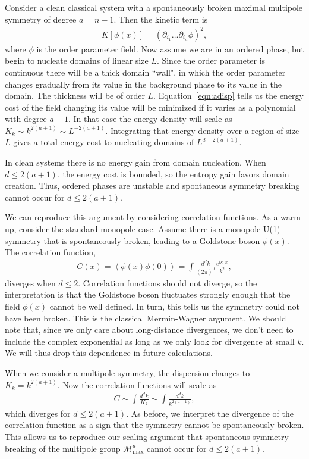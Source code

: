 \documentclass[twocolumn, longbibliography]{revtex4-2}
\renewcommand{\max}{\text{max}}
\begin{document}
Consider a clean classical system with a spontaneously broken maximal multipole symmetry of degree $a=n-1$.
Then the kinetic term is
\begin{align}
K[\phi(x)] = (\partial_{i_1} \dots \partial_{i_n} \phi)^2, \label{eqn:adisp}
\end{align} 
where $\phi$ is the order parameter field. 
Now assume we are in an ordered phase, but begin to nucleate domains of linear size $L$. Since the order parameter is continuous there will be a thick domain ``wall", in which the order parameter changes gradually from its value in the background phase to its value in the domain. The thickness will be of order $L$.
Equation~\ref{eqn:adisp} tells us the  energy cost of the field changing its value will be minimized if it varies as a polynomial with degree $a+1$. In that case the energy density will scale as $K_k \sim k^{2(a+1)} \sim L^{-2(a+1)}$. Integrating that energy density over a region of size $L$ gives a total energy cost to nucleating domains of $L^{d-2(a+1)}$.

In clean systems there is no energy gain from domain nucleation. When $d\le2(a+1)$, the energy cost is bounded, so the entropy gain favors domain creation. Thus, ordered phases are unstable and spontaneous symmetry breaking cannot occur for $d\le2(a+1)$.

We can reproduce this argument by considering correlation functions. As a warm-up, consider the standard monopole case. Assume there is a monopole U(1) symmetry that is spontaneously broken, leading to a Goldstone boson $\phi(x)$. The correlation function,
\begin{align}
C(x) = \left\langle \phi(x) \phi(0) \right\rangle = \int \frac{d^dk}{(2\pi)^d} \frac{e^{i k \cdot x}}{k^2}, 
\end{align}
diverges when $d\le 2$. Correlation functions should not diverge, so the interpretation is that the Goldstone boson fluctuates strongly enough that the field $\phi(x)$ cannot be well defined. In turn, this tells us the symmetry could not have been broken. This is the classical Mermin-Wagner argument. We should note that, since we only care about long-distance divergences, we don't need to include the complex exponential as long as we only look for divergence at small $k$. We will thus drop this dependence in future calculations. 

When we consider a multipole symmetry, the dispersion changes to $K_k=k^{2(a+1)}$. Now the correlation functions will scale as 
\begin{align}
C \sim \int \frac{d^dk}{K_k} \sim \int \frac{d^dk}{k^{2(a+1)}}, \label{eqn:correl}
\end{align}
which diverges for $d\le2(a+1)$. As before, we interpret the divergence of the correlation function as a sign that the symmetry cannot be spontaneously broken. This allows us to reproduce our scaling argument that spontaneous symmetry breaking of the multipole group $\mathcal{M}^a_\max$ cannot occur for $d\le2(a+1)$.
\end{document}
